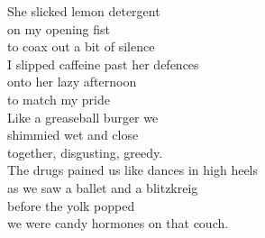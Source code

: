 She slicked lemon detergent\\
on my opening fist\\
to coax out a bit of silence\\
I slipped caffeine past her defences\\
onto her lazy afternoon\\
to match my pride\\
Like a greaseball burger we\\
shimmied wet and close\\
together, disgusting, greedy.\\
The drugs pained us like dances in high heels\\
as we saw a ballet and a blitzkreig\\
before the yolk popped\\
we were candy hormones on that couch.\\

